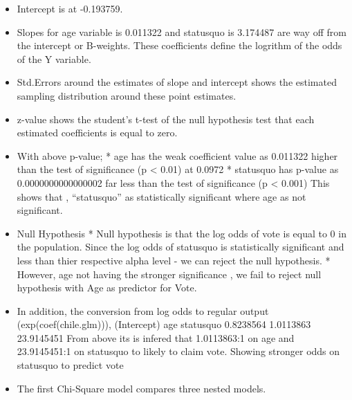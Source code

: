 \documentclass[]{article}
\providecommand{\tightlist}{%
  \setlength{\itemsep}{0pt}\setlength{\parskip}{0pt}}
\begin{document}
\begin{itemize}
\begin{itemize}
    \begin{itemize}
    \tightlist
    \item
      Intercept is at -0.193759.
    \item
      Slopes for age variable is 0.011322 and statusquo is 3.174487 are
      way off from the intercept or B-weights. These coefficients define
      the logrithm of the odds of the Y variable.
    \item
      Std.Errors around the estimates of slope and intercept shows the
      estimated sampling distribution around these point estimates.
    \item
      z-value shows the student's t-test of the null hypothesis test
      that each estimated coefficients is equal to zero.
    \item
      With above p-value; * age has the weak coefficient value as
      0.011322 higher than the test of significance (p \textless{} 0.01)
      at 0.0972 * statusquo has p-value as 0.0000000000000002 far less
      than the test of significance (p \textless{} 0.001) This shows
      that , ``statusquo'' as statistically significant where age as not
      significant.
    \item
      Null Hypothesis * Null hypothesis is that the log odds of vote is
      equal to 0 in the population. Since the log odds of statusquo is
      statistically significant and less than thier respective alpha
      level - we can reject the null hypothesis. * However, age not
      having the stronger significance , we fail to reject null
      hypothesis with Age as predictor for Vote.
    \item
      In addition, the conversion from log odds to regular output
      (exp(coef(chile.glm))), (Intercept) age statusquo 0.8238564
      1.0113863 23.9145451 From above its is infered that 1.0113863:1 on
      age and 23.9145451:1 on statusquo to likely to claim vote. Showing
      stronger odds on statusquo to predict vote
    \item
      The first Chi-Square model compares three nested models.


\end{itemize}
\end{itemize}
\end{itemize}
\end{document}
